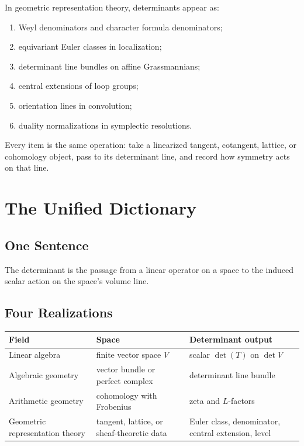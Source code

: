 \documentclass[11pt]{memoir}
\begin{document}
In geometric representation theory, determinants appear as:
\begin{enumerate}
\item Weyl denominators and character formula denominators;
\item equivariant Euler classes in localization;
\item determinant line bundles on affine Grassmannians;
\item central extensions of loop groups;
\item orientation lines in convolution;
\item duality normalizations in symplectic resolutions.
\end{enumerate}
Every item is the same operation: take a linearized tangent,
cotangent, lattice, or cohomology object, pass to its determinant
line, and record how symmetry acts on that line.

\chapter{The Unified Dictionary}
\label{ch:unified}

\section{One Sentence}
\label{sec:one-sentence}

The determinant is the passage from a linear operator on a space to
the induced scalar action on the space's volume line.

\section{Four Realizations}
\label{sec:four-realizations}

\begin{center}
\begin{tabular}{p{}p{}p{}}
\textbf{Field} & \textbf{Space} & \textbf{Determinant output}\\
\hline
Linear algebra & finite vector space \(V\) & scalar \(\det(T)\) on \(\det V\)\\
Algebraic geometry & vector bundle or perfect complex & determinant line bundle\\
Arithmetic geometry & cohomology with Frobenius & zeta and \(L\)-factors\\
Geometric representation theory & tangent, lattice, or sheaf-theoretic data & Euler class, denominator, central extension, level\\
\end{tabular}
\end{center}
\end{document}
